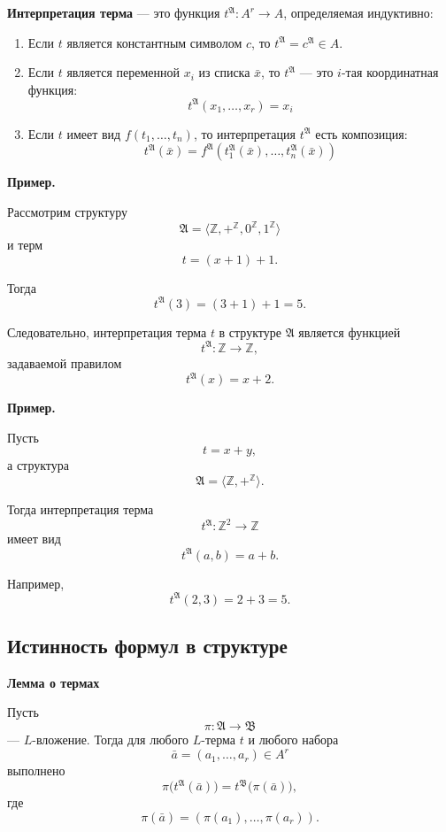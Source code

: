 \documentclass[12pt,a4paper,oneside,openany]{book}
\theoremstyle{definition}
\theoremstyle{plain}
\theoremstyle{remark}
\begin{document}
\textbf{Интерпретация терма} — это функция $t^{\mathfrak{A}}: A^r \to A$, определяемая индуктивно:

\begin{enumerate}
    \item[I.] Если $t$ является константным символом $c$, то $t^{\mathfrak{A}} = c^{\mathfrak{A}} \in A$.
    \item[II.] Если $t$ является переменной $x_i$ из списка $\bar{x}$, то $t^{\mathfrak{A}}$ — это $i$-тая координатная функция:
    \[ t^{\mathfrak{A}}(x_1, \dots, x_r) = x_i \]
    \item[III.] Если $t$ имеет вид $f(t_1, \dots, t_n)$, то интерпретация $t^{\mathfrak{A}}$ есть композиция:
    \[ t^{\mathfrak{A}}(\bar{x}) = f^{\mathfrak{A}}(t_1^{\mathfrak{A}}(\bar{x}), \dots, t_n^{\mathfrak{A}}(\bar{x})) \]
\end{enumerate}

\textbf{Пример.}

Рассмотрим структуру
\[
\mathfrak{A}=\langle \mathbb{Z}, +^{\mathbb{Z}}, 0^{\mathbb{Z}}, 1^{\mathbb{Z}} \rangle
\]
и терм
\[
t=(x+1)+1.
\]

Тогда
\[
t^{\mathfrak{A}}(3)
=
(3+1)+1
=
5.
\]

Следовательно, интерпретация терма $t$ в структуре $\mathfrak{A}$ является функцией
\[
t^{\mathfrak{A}}:\mathbb{Z}\to\mathbb{Z},
\]
задаваемой правилом
\[
t^{\mathfrak{A}}(x)=x+2.
\]

\textbf{Пример.}

Пусть
\[
t=x+y,
\]
а структура
\[
\mathfrak{A}=\langle \mathbb{Z}, +^{\mathbb{Z}} \rangle.
\]

Тогда интерпретация терма
\[
t^{\mathfrak{A}}:\mathbb{Z}^2\to\mathbb{Z}
\]
имеет вид
\[
t^{\mathfrak{A}}(a,b)=a+b.
\]

Например,
\[
t^{\mathfrak{A}}(2,3)=2+3=5.
\]




\subsection{Истинность формул в структуре}

\textbf{Лемма о термах}

Пусть
\[
\pi:\mathfrak A\to\mathfrak B
\]
— $L$-вложение. Тогда для любого $L$-терма $t$ и любого набора
\[
\bar a=(a_1,\ldots,a_r)\in A^r
\]
выполнено
\[
\pi\bigl(t^{\mathfrak A}(\bar a)\bigr)
=
t^{\mathfrak B}\bigl(\pi(\bar a)\bigr),
\]
где
\[
\pi(\bar a)=(\pi(a_1),\ldots,\pi(a_r)).
\]
\end{document}
